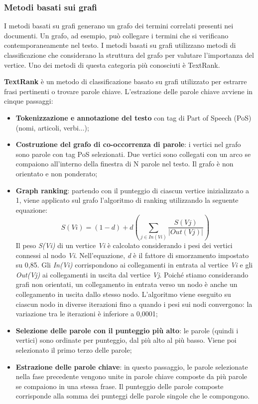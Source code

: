 \subsubsection{Metodi basati sui grafi}
I metodi basati su grafi generano un grafo dei termini correlati presenti nei documenti. Un grafo, ad esempio, può collegare i termini che si verificano contemporaneamente nel testo. I metodi basati su grafi utilizzano metodi di classificazione che considerano la struttura del grafo per valutare l'importanza del vertice. Uno dei metodi di questa categoria più conosciuti è TextRank.

\textbf{TextRank} è un metodo di classificazione basato su grafi utilizzato per estrarre frasi pertinenti o trovare parole chiave. L'estrazione delle parole chiave avviene in cinque passaggi:

\begin{itemize}
\item \textbf{Tokenizzazione e annotazione del testo} con tag di Part of Speech (PoS) (nomi, articoli, verbi...);
\item \textbf{Costruzione del grafo di co-occorrenza di parole}: i vertici nel grafo sono parole con tag PoS selezionati. Due vertici sono collegati con un arco se compaiono all'interno della finestra di N parole nel testo. Il grafo è non orientato e non ponderato;
\item \textbf{Graph ranking}: partendo con il punteggio di ciascun vertice inizializzato a 1, viene applicato sul grafo l'algoritmo di ranking utilizzando la seguente equazione:
\begin{equation}
S(Vi)=(1 - d) + d\left (\sum_{j \in In(Vi)} \frac{S(Vj)}{|Out(Vj)|}\right )
\end{equation}
Il peso \textit{S(Vi)} di un vertice \textit{Vi} è calcolato considerando i pesi dei vertici connessi al nodo \textit{Vi}. Nell'equazione, \textit{d} è il fattore di smorzamento impostato su 0,85. Gli \textit{In(Vi)} corrispondono ai collegamenti in entrata al vertice \textit{Vi} e gli \textit{Out(Vj)} ai collegamenti in uscita dal vertice \textit{Vj}. Poiché stiamo considerando grafi non orientati, un collegamento in entrata verso un nodo è anche un collegamento in uscita dallo stesso nodo. L'algoritmo viene eseguito su ciascun nodo in diverse iterazioni fino a quando i pesi sui nodi convergono: la variazione tra le iterazioni è inferiore a 0,0001;
\item \textbf{Selezione delle parole con il punteggio più alto}: le parole (quindi i vertici) sono ordinate per punteggio, dal più alto al più basso. Viene poi selezionato il primo terzo delle parole;
\item \textbf{Estrazione delle parole chiave}: in questo passaggio, le parole selezionate nella fase precedente vengono unite in parole chiave composte da più parole se compaiono in una stessa frase. Il punteggio delle parole composte corrisponde alla somma dei punteggi delle parole singole che le compongono.
\end{itemize}

